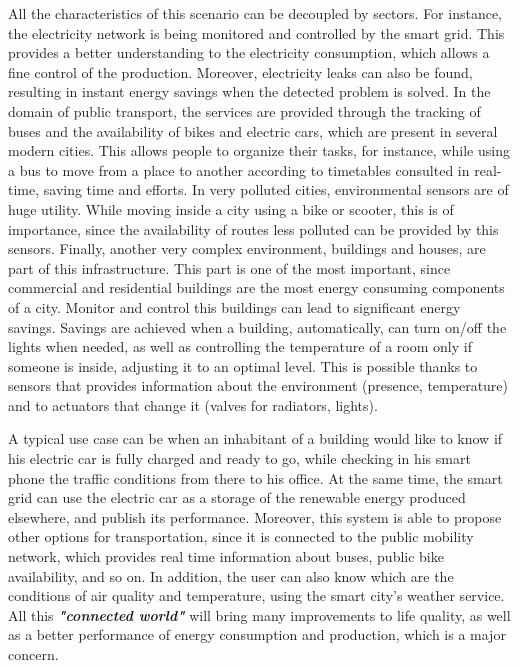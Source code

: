All the characteristics of this scenario can be decoupled by sectors.
For instance, the electricity network is being monitored and controlled by the smart grid\todo{\cite{}}.
This provides a better understanding to the electricity consumption, which allows a fine control of the production.
Moreover, electricity leaks can also be found, resulting in instant energy savings when the detected problem is solved.
In the domain of public transport, the services are provided through the tracking of buses and the availability of bikes and electric cars, which are present in several modern cities.
This allows people to organize their tasks, for instance, while using a bus to move from a place to another according to timetables consulted in real-time, saving time and efforts.
In very polluted cities, environmental sensors are of huge utility.
While moving inside a city using a bike or scooter, this is of importance, since the availability of routes less polluted can be provided by this sensors.
Finally, another very complex environment, buildings and houses, are part of this infrastructure.
This part is one of the most important, since commercial and residential buildings are the most energy consuming components of a city\cite{perezLombard2008energy}.
Monitor and control this buildings can lead to significant energy savings.
Savings are achieved when a building, automatically, can turn on/off the lights when needed, as well as controlling the temperature of a room only if someone is inside, adjusting it to an optimal level.
This is possible thanks to sensors that provides information about the environment (presence, temperature) and to actuators that change it (valves for radiators, lights).


A typical use case can be when an inhabitant of a building would like to know if his electric car is fully charged and ready to go, while checking in his smart phone the traffic conditions from there to his office.
At the same time, the smart grid can use the electric car as a storage of the renewable energy produced elsewhere, and publish its performance.
Moreover, this system is able to propose other options for transportation, since it is connected to the public mobility network, which provides real time information about buses, public bike availability, and so on.
In addition, the user can also know which are the conditions of air quality and temperature, using the smart city's weather service.
All this \textit{\textbf{"connected world"}} will bring many improvements to life quality, as well as a better performance of energy consumption and production, which is a major concern.


